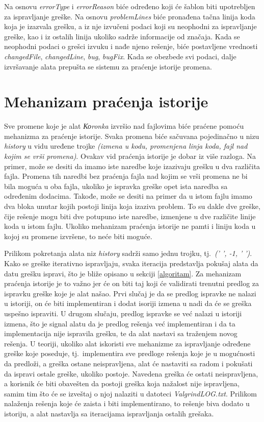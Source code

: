 \documentclass[12pt,oneside]{memoir}
\theoremstyle{plain}
\theoremstyle{definition}
\begin{document}
Na osnovu \textit{errorType} i \textit{errorReason} biće određeno koji će šablon biti upotrebljen za ispravljanje greške. Na osnovu \textit{problemLines} biće pronađena tačna linija koda koja je izazvala grešku, a iz nje izvučeni podaci koji su neophodni za ispravljanje greške, kao i iz ostalih linija ukoliko sadrže informacije od značaja. Kada se neophodni podaci o grešci izvuku i nađe njeno rešenje, biće postavljene vrednosti \textit{changedFile}, \textit{changedLine}, \textit{bug}, \textit{bugFix}. Kada se obezbede svi podaci, dalje izvršavanje alata prepušta se sistemu za praćenje istorije promena.

\section{Mehanizam praćenja istorije}\label{istorija}
Sve promene koje je alat \textit{Коronka} izvršio nad fajlovima biće praćene pomoću mehanizma za praćenje istorije. Svaka promena biće sačuvana pojedinačno u nizu \textit{history} u vidu uređene trojke \textit{(izmena u kodu, promenjena linja koda, fajl nad kojim se vrši promena)}. Ovakav vid praćenja istorije je dobar iz više razloga. Na primer, može se desiti da imamo iste naredbe koje izazivaju grešku u dva različita fajla. Promena tih naredbi bez praćenja fajla nad kojim se vrši promena ne bi bila moguća u oba fajla, ukoliko je ispravka greške opet ista naredba sa određenim dodacima. Takođe, može se desiti na primer da u istom fajlu imamo dva bloka unutar kojih postoji linija koja izaziva problem. To su dakle dve greške, čije rešenje mogu biti dve potupuno iste naredbe, izmenjene u dve različite linije koda u istom fajlu. Ukoliko mehanizam praćenja istorije ne pamti i liniju koda u kojoj su promene izvršene, to neće biti moguće.  

Prilikom pokretanja alata niz \textit{history} sadrži samo jednu trojku, tj.~\textit{(' ', -1, ' ')}. Kako se greške iterativno ispravljaju, svaka iteracija predstavlja pokušaj alata da datu grešku ispravi, što je bliže opisano u sekciji \ref{algoritam}. Za mehanizam praćenja istorije je to važno jer će on biti taj koji će validirati trenutni predlog za ispravku greške koje je alat našao. Prvi slučaj je da se predlog ispravke ne nalazi u istoriji, on će biti implementiran i dodat isoriji izmena u nadi da će se greška uspešno ispraviti. U drugom slučaju, predlog ispravke se već nalazi u istoriji izmena, što je signal alatu da je predlog rešenja već implementiran i da ta implementacija nije ispravila grešku, te da alat nastavi sa traženjem novog rešenja. U teoriji, ukoliko alat iskoristi sve mehanizme za ispravljanje određene greške koje poseduje, tj.~implementira sve predloge rešenja koje je u mogućnosti da predloži, a greška ostane neispravljena, alat će nastaviti sa radom i pokušati da ispravi ostale greške, ukoliko postoje. Navedena greška će ostati neispravljena, a korisnik će biti obavešten da postoji greška koja nažalost nije ispravljena, samim tim što će se izveštaj o njoj nalaziti u datoteci \textit{ValgrindLOG.txt}. Prilikom nalaženja rešenja koje će zaista i biti implementirano, to rešenje biva dodato u istoriju, a alat nastavlja sa iteracijama ispravljanja ostalih grešaka.
\end{document}
